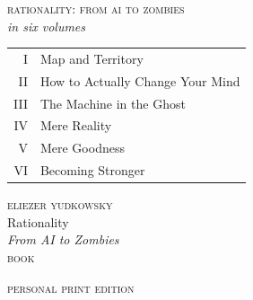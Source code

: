\thispagestyle{empty}
\vspace*{0.22\textheight}
\begin{center}
  {\Large{}\scshape\MakeLowercase{\RAZBookTitle}}
\end{center}
\clearpage
\thispagestyle{empty}
\vspace*{0.22\textheight}
\begin{center}
  \small
  {\scshape rationality: from ai to zombies}\\[1ex]
  {\itshape in six volumes}\\[3ex]
  \renewcommand\arraystretch{1.35}%
  \begin{tabular}{@{}r@{\quad}l@{}}
    I   & Map and Territory\\
    II  & How to Actually Change Your Mind\\
    III & The Machine in the Ghost\\
    IV  & Mere Reality\\
    V   & Mere Goodness\\
    VI  & Becoming Stronger\\
  \end{tabular}
\end{center}
\clearpage
\thispagestyle{empty}
\vspace*{0.12\textheight}
\begin{center}
  {\large{}\scshape eliezer yudkowsky}\\[0.11\textheight]
  {\fontsize{26}{30}\selectfont Rationality}\\[1.2ex]
  {\Large\itshape From AI to Zombies}\\[0.08\textheight]
  {\scshape book \RAZvol{\RAZVolume}}\\[2ex]
  {\LARGE \RAZBookTitle}\par
  \vfill
  {\small{}\scshape personal print edition}
\end{center}
\clearpage
\thispagestyle{empty}
